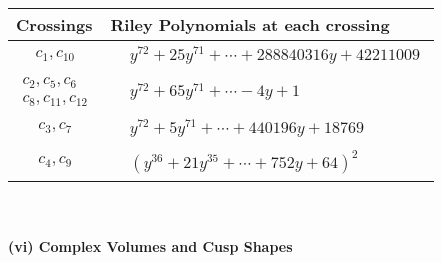 \documentclass[1p]{elsarticle_modified}
\theoremstyle{definition}
\begin{document}
\begin{tabular}{m{50pt}|m{274pt}}
Crossings & \hspace{64pt}Riley Polynomials at each crossing \\
\hline $$\begin{aligned}c_{1},c_{10}\end{aligned}$$&$\begin{aligned}
&y^{72}+25 y^{71}+\cdots+288840316 y+42211009
\end{aligned}$\\
\hline $$\begin{aligned}c_{2},c_{5},c_{6}\\c_{8},c_{11},c_{12}\end{aligned}$$&$\begin{aligned}
&y^{72}+65 y^{71}+\cdots-4 y+1
\end{aligned}$\\
\hline $$\begin{aligned}c_{3},c_{7}\end{aligned}$$&$\begin{aligned}
&y^{72}+5 y^{71}+\cdots+440196 y+18769
\end{aligned}$\\
\hline $$\begin{aligned}c_{4},c_{9}\end{aligned}$$&$\begin{aligned}
&(y^{36}+21 y^{35}+\cdots+752 y+64)^{2}
\end{aligned}$\\
\hline
\end{tabular}\\~\\
\newpage\flushleft \textbf{(vi) Complex Volumes and Cusp Shapes}
\end{document}
